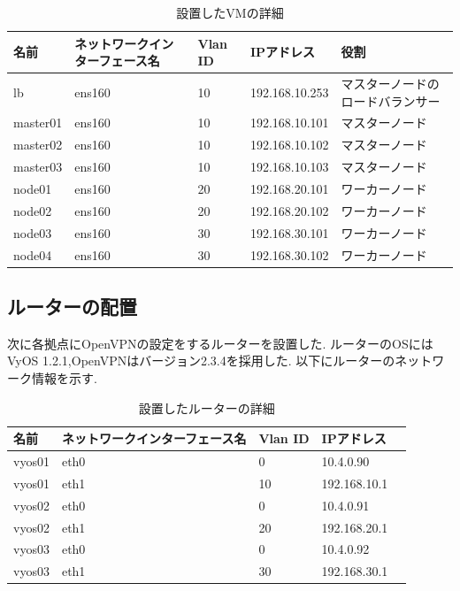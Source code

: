 \begin{landscape}
  \begin{table}[htb]
    \begin{center}
      \caption{設置したVMの詳細}
      \begin{tabular}{|l|l|l|l|l|} \hline
        名前 & ネットワークインターフェース名 & Vlan ID & IPアドレス & 役割 \\ \hline
        lb & ens160 & 10 & 192.168.10.253 & マスターノードのロードバランサー \\ \hline
        master01 & ens160 & 10 & 192.168.10.101 & マスターノード \\ \hline
        master02 & ens160 & 10 & 192.168.10.102 & マスターノード \\ \hline
        master03 & ens160 & 10 & 192.168.10.103 & マスターノード \\ \hline
        node01 & ens160 & 20 & 192.168.20.101 & ワーカーノード \\ \hline
        node02 & ens160 & 20 & 192.168.20.102 & ワーカーノード \\ \hline
        node03 & ens160 & 30 & 192.168.30.101 & ワーカーノード \\ \hline
        node04 & ens160 & 30 & 192.168.30.102 & ワーカーノード \\ \hline
      \end{tabular}
    \end{center}
  \end{table}
\end{landscape}

\subsection{ルーターの配置}

次に各拠点にOpenVPNの設定をするルーターを設置した.
ルーターのOSにはVyOS 1.2.1,OpenVPNはバージョン2.3.4を採用した.
以下にルーターのネットワーク情報を示す.

\begin{table}[htb]
  \begin{center}
    \caption{設置したルーターの詳細}
    \begin{tabular}{|l|l|l|l|l|} \hline
      名前 & ネットワークインターフェース名 & Vlan ID & IPアドレス \\ \hline
      vyos01 & eth0 & 0 & 10.4.0.90 \\ \hline
      vyos01 & eth1 & 10 & 192.168.10.1 \\ \hline
      vyos02 & eth0 & 0 & 10.4.0.91 \\ \hline
      vyos02 & eth1 & 20 & 192.168.20.1 \\ \hline
      vyos03 & eth0 & 0 & 10.4.0.92 \\ \hline
      vyos03 & eth1 & 30 & 192.168.30.1 \\ \hline
    \end{tabular}
  \end{center}
\end{table}

